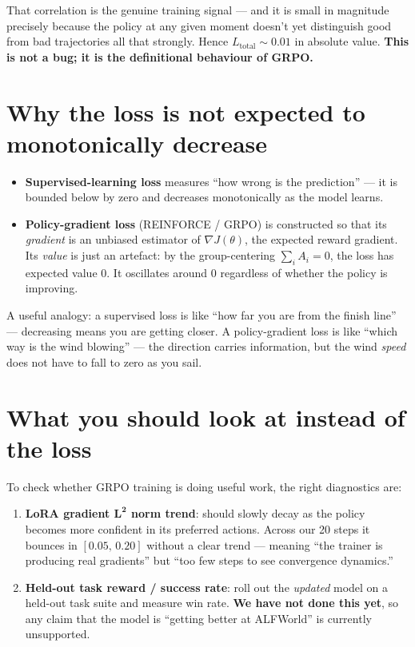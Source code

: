 \documentclass[11pt,a4paper]{article}
\begin{document}
That correlation is the genuine training signal --- and it is small in
magnitude precisely because the policy at any given moment doesn't yet
distinguish good from bad trajectories all that strongly. Hence
$L_{\text{total}} \sim 0.01$ in absolute value. \textbf{This is not a bug;
it is the definitional behaviour of GRPO.}

\section{Why the loss is not expected to monotonically decrease}

\begin{itemize}[leftmargin=1.6em]
\item \textbf{Supervised-learning loss} measures ``how wrong is the
prediction'' --- it is bounded below by zero and decreases monotonically as
the model learns.

\item \textbf{Policy-gradient loss} (REINFORCE / GRPO) is constructed so
that its \emph{gradient} is an unbiased estimator of $\nabla J(\theta)$,
the expected reward gradient. Its \emph{value} is just an artefact: by the
group-centering $\sum_i A_i = 0$, the loss has expected value $0$. It
oscillates around $0$ regardless of whether the policy is improving.
\end{itemize}

A useful analogy: a supervised loss is like ``how far you are from the
finish line'' --- decreasing means you are getting closer. A
policy-gradient loss is like ``which way is the wind blowing'' --- the
direction carries information, but the wind \emph{speed} does not have
to fall to zero as you sail.

\section{What you should look at instead of the loss}

To check whether GRPO training is doing useful work, the right diagnostics
are:

\begin{enumerate}[leftmargin=1.6em]
\item \textbf{LoRA gradient $\bm{L^2}$ norm trend}: should slowly decay as
the policy becomes more confident in its preferred actions. Across our
20 steps it bounces in $[0.05,\,0.20]$ without a clear trend --- meaning
``the trainer is producing real gradients'' but ``too few steps to see
convergence dynamics.''

\item \textbf{Held-out task reward / success rate}: roll out the
\emph{updated} model on a held-out task suite and measure win rate.
\textbf{We have not done this yet}, so any claim that the model is
``getting better at ALFWorld'' is currently unsupported.
\end{enumerate}
\end{document}

